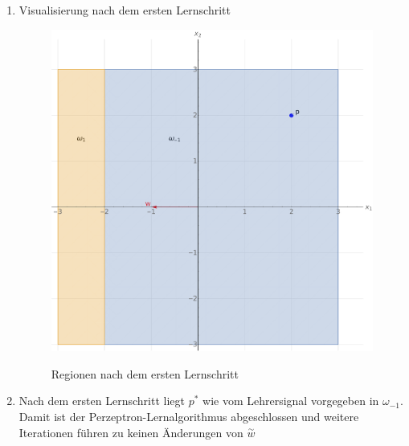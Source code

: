\documentclass{article}
\begin{document}
\begin{enumerate}[label=\arabic*.]
  \item Visualisierung nach dem ersten Lernschritt
        \begin{figure}[H]
          \textit{}\centering
          \includegraphics[width=\textwidth]{separation-regions2.pdf}
          \caption{Regionen nach dem ersten Lernschritt}
        \end{figure}
  \item Nach dem ersten Lernschritt liegt $p^*$ wie vom Lehrersignal vorgegeben in $\omega_{-1}$. Damit ist der Perzeptron-Lernalgorithmus abgeschlossen und weitere Iterationen führen zu keinen Änderungen von $\overset{\sim}{w}$
\end{enumerate}
\end{document}
